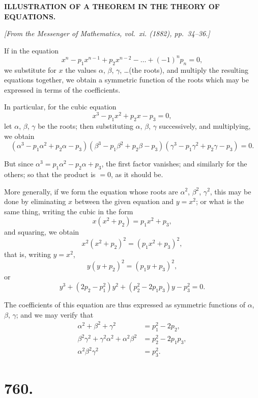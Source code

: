 \documentclass[12pt,a4paper]{article}
\begin{document}
\begin{center}
\textbf{ILLUSTRATION OF A THEOREM IN THE THEORY OF EQUATIONS.}
\end{center}

\begin{flushright}
\textit{[From the Messenger of Mathematics, vol.~xi. (1882), pp.~34--36.]}
\end{flushright}

If in the equation
%
\[
x^n - p_1 x^{n-1} + p_2 x^{n-2} - \ldots + (-1)^n p_n = 0,
\]
we substitute for $x$ the values $\alpha$, $\beta$, $\gamma$, \ldots (the roots), and multiply
the resulting equations together, we obtain a symmetric function of the roots
which may be expressed in terms of the coefficients.

In particular, for the cubic equation
%
\[
x^3 - p_1 x^2 + p_2 x - p_3 = 0,
\]
let $\alpha$, $\beta$, $\gamma$ be the roots; then substituting $\alpha$, $\beta$, $\gamma$ successively,
and multiplying, we obtain
%
\[
(\alpha^3 - p_1 \alpha^2 + p_2 \alpha - p_3)
(\beta^3 - p_1 \beta^2 + p_2 \beta - p_3)
(\gamma^3 - p_1 \gamma^2 + p_2 \gamma - p_3) = 0.
\]

But since $\alpha^3 = p_1 \alpha^2 - p_2 \alpha + p_3$, the first factor vanishes; and similarly
for the others; so that the product is $=0$, as it should be.

More generally, if we form the equation whose roots are $\alpha^2$, $\beta^2$, $\gamma^2$,
this may be done by eliminating $x$ between the given equation and $y = x^2$;
or what is the same thing, writing the cubic in the form
%
\[
x(x^2 + p_2) = p_1 x^2 + p_3,
\]
%
and squaring, we obtain
%
\[
x^2 (x^2 + p_2)^2 = (p_1 x^2 + p_3)^2,
\]
%
that is, writing $y = x^2$,
%
\[
y(y + p_2)^2 = (p_1 y + p_3)^2,
\]
%
or
%
\[
y^3 + (2p_2 - p_1^2) y^2 + (p_2^2 - 2p_1 p_3) y - p_3^2 = 0.
\]

The coefficients of this equation are thus expressed as symmetric functions
of $\alpha$, $\beta$, $\gamma$; and we may verify that
%
\begin{align*}
\alpha^2 + \beta^2 + \gamma^2 &= p_1^2 - 2p_2, \\
\beta^2\gamma^2 + \gamma^2\alpha^2 + \alpha^2\beta^2 &= p_2^2 - 2p_1 p_3, \\
\alpha^2 \beta^2 \gamma^2 &= p_3^2.
\end{align*}

\newpage


\section*{760.}
\end{document}
